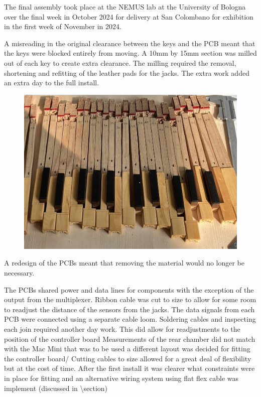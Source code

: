 The final assembly took place at the NEMUS lab at the University of
Bologna over the final week in October 2024 for delivery at San
Colombano for exhibition in the first week of November in 2024.

A misreading in the original clearance between the keys and the PCB
meant that the keys were blocked entirely from moving. A 10mm by 15mm
section was milled out of each key to create extra
clearance. The milling required the removal, shortening and refitting of
the leather pads for the jacks. The extra work
added an extra day to the full install.

\begin{figure}  
  \centering
  \includegraphics[width=\linewidth]{src/images/keys-milled.jpeg} 
  \caption{} 
  \Description{} 
  \label{fig:milling}
\end{figure}

A redesign of the PCBs meant that removing the material would no longer
be necessary.

The PCBs shared power and data lines for components with the exception
of the output from the multiplexer. Ribbon cable was cut to size to
allow for some room to readjust the distance of the sensors from the
jacks. The data signals from each PCB were connected using a separate
cable loom. Soldering cables and inspecting each join required another
day work. This did allow for readjustments to the position of the
controller board Measurements of the rear chamber did not match with the
Mac Mini that was to be used a different layout was decided for fitting
the controller board/ Cutting cables to size allowed for a great deal of
flexibility but at the cost of time. After the first install it was
clearer what constraints were in place for fitting and an alternative
wiring system using flat flex cable was implement (discussed in
\textbackslash section)

